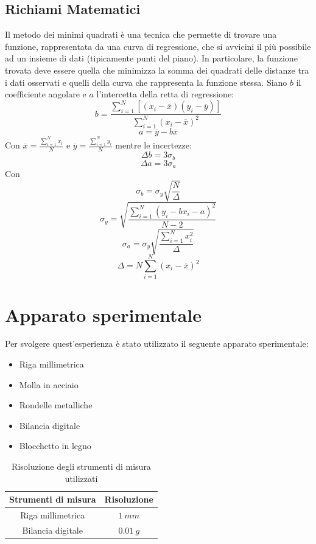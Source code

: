 \documentclass[11pt]{article}
\begin{document}
\subsection{Richiami Matematici}
Il metodo dei minimi quadrati è una tecnica che permette di trovare una funzione, rappresentata da una curva di regressione, che si avvicini il più possibile ad un insieme di dati (tipicamente punti del piano). In particolare, la funzione trovata deve essere quella che minimizza la somma dei quadrati delle distanze tra i dati osservati e quelli della curva che rappresenta la funzione stessa. Siano $b$ il coefficiente angolare e $a$ l'intercetta della retta di regressione:
\begin{equation}
    b=\frac{\displaystyle\sum_{i=1}^{N}[(x_i-\overline{x})(y_i-\overline{y})]}{\displaystyle\sum_{i=1}^{N}(x_i-\overline{x})^2}
\end{equation}
\begin{equation}
    a=\overline{y}-b\overline{x}
\end{equation}
Con $\overline{x}=\frac{\displaystyle\sum_{i=1}^{N}x_i}{N}$ e $\overline{y}=\frac{\displaystyle\sum_{i=1}^{N}y_i}{N}$
mentre le incertezze:
\begin{equation}
    \Delta b=3\sigma_b
\end{equation}
\begin{equation}
    \Delta a=3\sigma_a
\end{equation}
Con $$\sigma_b=\sigma_y\sqrt{\frac{N}{\Delta}}$$
$$\sigma_y=\sqrt{\frac{\displaystyle\sum_{i=1}^{N}(y_i-bx_i-a)^2}{N-2}}$$
$$\sigma_a=\sigma_y\sqrt{\frac{\displaystyle\sum_{i=1}^{N}x_i^2}{\Delta}}$$
$$\Delta=N\displaystyle\sum_{i=1}^{N}(x_i-\overline{x})^2$$

\section{Apparato sperimentale}

Per svolgere quest'esperienza è stato utilizzato il seguente apparato sperimentale:
\begin{itemize}
    \item Riga millimetrica
    \item Molla in acciaio
    \item Rondelle metalliche
    \item Bilancia digitale
    \item Blocchetto in legno
\end{itemize}

\begin{table}[H]
\centering
\begin{tabular}{|c|c|}
\hline
\textbf{Strumenti di misura} & \textbf{Risoluzione} \\
\hline
Riga millimetrica & $1\ mm$ \\
Bilancia digitale & $0.01\ g$ \\
\hline
\end{tabular}
\caption{Risoluzione degli strumenti di misura utilizzati}
\label{tab:}
\end{table}
\end{document}
